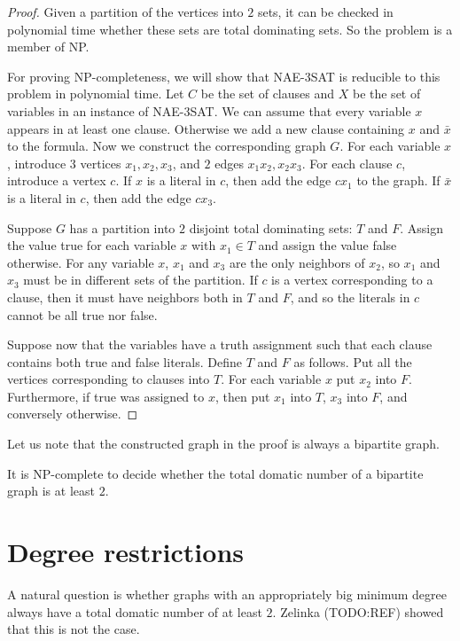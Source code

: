 \begin{proof}
  Given a partition of the vertices into $2$ sets, it can be checked in polynomial
  time whether these sets are total dominating sets. So the problem is a member
  of NP.

  For proving NP-completeness, we will show that NAE-3SAT is reducible to this problem
  in polynomial time. Let $C$ be the set of clauses and $X$ be the set of variables
  in an instance of NAE-3SAT. We can assume that every variable $x$ appears in at least
  one clause. Otherwise we add a new clause containing $x$ and $\bar{x}$ to
  the formula. Now we construct the corresponding graph $G$. For each variable $x$,
  introduce $3$ vertices $x_1, x_2, x_3$, and $2$ edges $x_1x_2, x_2x_3$. For each
  clause $c$, introduce a vertex $c$. If $x$ is a literal in $c$, then add the edge
  $cx_1$ to the graph. If $\bar{x}$ is a literal in $c$, then add the edge $cx_3$.

  Suppose $G$ has a partition into $2$ disjoint total dominating sets: $T$ and $F$.
  Assign the value true for each variable $x$ with $x_1 \in T$ and assign the value
  false otherwise. For any variable $x$, $x_1$ and $x_3$ are the only neighbors
  of $x_2$, so $x_1$ and $x_3$ must be in different sets of the partition. If $c$
  is a vertex corresponding to a clause, then it must have neighbors both in $T$
  and $F$, and so the literals in $c$ cannot be all true nor false.

  Suppose now that the variables have a truth assignment such that each clause
  contains both true and false literals. Define $T$ and $F$ as follows. Put all
  the vertices corresponding to clauses into $T$. For each variable $x$ put $x_2$
  into $F$. Furthermore, if true was assigned to $x$, then put $x_1$ into $T$, $x_3$
  into $F$, and conversely otherwise.
\end{proof}

Let us note that the constructed graph in the proof is always a bipartite
graph.

\begin{cor}
  It is NP-complete to decide whether the total domatic number of
  a bipartite graph is at least $2$.
\end{cor}

\section{Degree restrictions}

A natural question is whether graphs with an appropriately big minimum degree
always have a total domatic number of at least $2$. Zelinka (TODO:REF) showed
that this is not the case.

